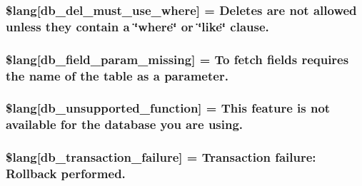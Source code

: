 \subsubsection[{\$lang}]{\setlength{\rightskip}{0pt plus 5cm}\$lang\mbox{[}\textquotesingle{}db\+\_\+del\+\_\+must\+\_\+use\+\_\+where\textquotesingle{}\mbox{]} = \textquotesingle{}Deletes are not allowed unless they contain {\bf a} \char`\"{}where\char`\"{} or \char`\"{}like\char`\"{} clause.\textquotesingle{}}\label{system_2language_2english_2db__lang_8php_a256ae2de791e589ddc23012f74f390ea}
\hypertarget{system_2language_2english_2db__lang_8php_a9101352a8cd8c8f34a6b8b1e30c45d8a}{}
\subsubsection[{\$lang}]{\setlength{\rightskip}{0pt plus 5cm}\$lang\mbox{[}\textquotesingle{}db\+\_\+field\+\_\+param\+\_\+missing\textquotesingle{}\mbox{]} = \textquotesingle{}To fetch fields requires the name of the table as {\bf a} parameter.\textquotesingle{}}\label{system_2language_2english_2db__lang_8php_a9101352a8cd8c8f34a6b8b1e30c45d8a}
\hypertarget{system_2language_2english_2db__lang_8php_a77c256be8532e23e8463481f51732116}{}
\subsubsection[{\$lang}]{\setlength{\rightskip}{0pt plus 5cm}\$lang\mbox{[}\textquotesingle{}db\+\_\+unsupported\+\_\+function\textquotesingle{}\mbox{]} = \textquotesingle{}This feature is not available {\bf for} the database you are using.\textquotesingle{}}\label{system_2language_2english_2db__lang_8php_a77c256be8532e23e8463481f51732116}
\hypertarget{system_2language_2english_2db__lang_8php_a35f225a7ead01f13f8c6423b7c7433a0}{}
\subsubsection[{\$lang}]{\setlength{\rightskip}{0pt plus 5cm}\$lang\mbox{[}\textquotesingle{}db\+\_\+transaction\+\_\+failure\textquotesingle{}\mbox{]} = \textquotesingle{}Transaction failure\+: Rollback performed.\textquotesingle{}}\label{system_2language_2english_2db__lang_8php_a35f225a7ead01f13f8c6423b7c7433a0}
\hypertarget{system_2language_2english_2db__lang_8php_af391f0d50d64cbb95cd733fa947fdb5e}{}
